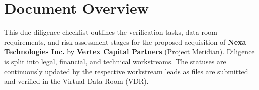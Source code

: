 \documentclass[11pt,a4paper]{article}
\begin{document}
\dueDiligenceHeader

\section*{Document Overview}
This due diligence checklist outlines the verification tasks, data room requirements, and risk assessment stages for the proposed acquisition of \textbf{Nexa Technologies Inc.} by \textbf{Vertex Capital Partners} (Project Meridian). Diligence is split into legal, financial, and technical workstreams. The statuses are continuously updated by the respective workstream leads as files are submitted and verified in the Virtual Data Room (VDR).






\newpage


\end{document}
